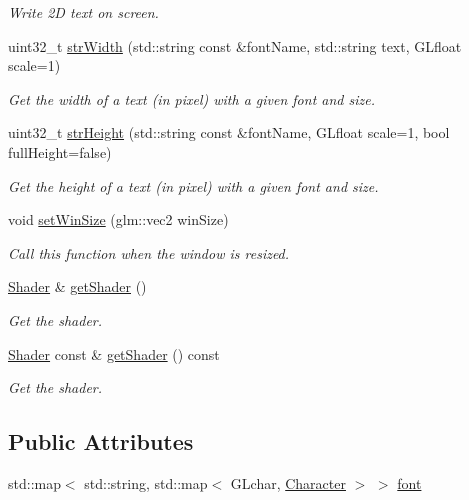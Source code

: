 \begin{DoxyCompactItemize}
\begin{DoxyCompactList}\small\item\em Write 2D text on screen. \end{DoxyCompactList}\item 
uint32\+\_\+t \hyperlink{class_text_render_a26975c1b71e98bf4d60abfebc2942816}{str\+Width} (std\+::string const \&font\+Name, std\+::string text, G\+Lfloat scale=1)
\begin{DoxyCompactList}\small\item\em Get the width of a text (in pixel) with a given font and size. \end{DoxyCompactList}\item 
uint32\+\_\+t \hyperlink{class_text_render_adcc7c69ed41b00e24e67de1d00a7da35}{str\+Height} (std\+::string const \&font\+Name, G\+Lfloat scale=1, bool full\+Height=false)
\begin{DoxyCompactList}\small\item\em Get the height of a text (in pixel) with a given font and size. \end{DoxyCompactList}\item 
void \hyperlink{class_text_render_a5faff9b32e8be1d14d1f9c4a8b66ebcc}{set\+Win\+Size} (glm\+::vec2 win\+Size)
\begin{DoxyCompactList}\small\item\em Call this function when the window is resized. \end{DoxyCompactList}\item 
\hyperlink{class_shader}{Shader} \& \hyperlink{class_text_render_afcb6b4a05cfabeb19c1f6d16ed1635ea}{get\+Shader} ()
\begin{DoxyCompactList}\small\item\em Get the shader. \end{DoxyCompactList}\item 
\hyperlink{class_shader}{Shader} const  \& \hyperlink{class_text_render_a2f313ec58b45ca41ec145f898aa35dc5}{get\+Shader} () const
\begin{DoxyCompactList}\small\item\em Get the shader. \end{DoxyCompactList}\end{DoxyCompactItemize}
\subsection*{Public Attributes}
\begin{DoxyCompactItemize}
\item 
std\+::map$<$ std\+::string, std\+::map$<$ G\+Lchar, \hyperlink{struct_text_render_1_1_character}{Character} $>$ $>$ \hyperlink{class_text_render_a0c196776d7ad5f5bb52928edd5727144}{font}
\end{DoxyCompactItemize}


